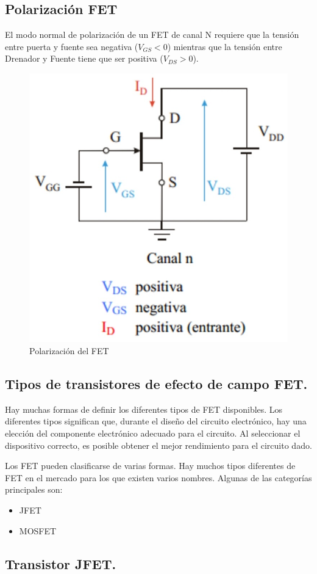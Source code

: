 \documentclass[12pt, a4paper]{article}
\begin{document}
    \subsection{Polarización FET}

    El modo normal de polarización de un FET de canal N requiere que la tensión entre puerta y fuente sea negativa ($V_{GS} < 0$) mientras que la tensión entre Drenador y Fuente tiene que ser positiva ($V_{DS} > 0$).

    \begin{figure}[h!]
        \centering
        \includegraphics[height=5cm\textwidth]{polarizacionfet.jpg}
        \caption{Polarización del FET}
        \label{fig:t3}
    \end{figure}

    \subsection{Tipos de transistores de efecto de campo FET.}

    Hay muchas formas de definir los diferentes tipos de FET disponibles. Los diferentes tipos significan que, durante el diseño del circuito electrónico, hay una elección del componente electrónico adecuado para el circuito. Al seleccionar el dispositivo correcto, es posible obtener el mejor rendimiento para el circuito dado.
    
    Los FET pueden clasificarse de varias formas. Hay muchos tipos diferentes de FET en el mercado para los que existen varios nombres. Algunas de las categorías principales son:

    \begin{itemize}
        \item JFET
        \item MOSFET
    \end{itemize}

    \subsection{Transistor JFET.}
\end{document}

